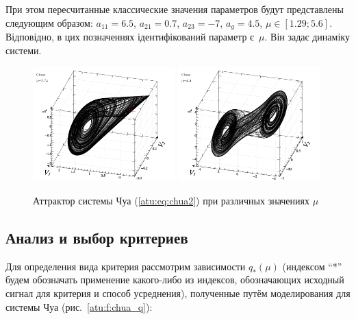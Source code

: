 При этом пересчитанные классические значения параметров будут представлены следующим образом:
$ a_{11} = 6.5 $, $a_{21} = 0.7$, $ a_{23} = -7 $, $ a_g = 4.5 $,
$ \mu \in [ 1.29 ; 5.6 ] $.
Відповідно, в цих позначеннях ідентифікований параметр є~$\mu$.
Він задає динаміку системи.



\begin{figure}[htb!]
\centerline{
  \includegraphics[width=0.49\textwidth]{p/cha/chua/chua_1-p_xyz_mu=2x74.png}
  \includegraphics[width=0.49\textwidth]{p/cha/chua/chua_1-p_xyz_mu=4x50.png}
}
\caption{Аттрактор системы Чуа (\ref{atu:eq:chua2}) при различных значениях $\mu$}
\label{atu:f:chua_phase}
\end{figure}



\subsection{Анализ и выбор критериев}  %


Для определения вида критерия рассмотрим зависимости
$q_{*}(\mu) $ (индексом ``*'' будем обозначать применение какого-либо из индексов,
обозначающих исходный сигнал для критерия и способ усреднения),
полученные путём моделирования
для системы Чуа (рис.~\ref{atu:f:chua_q}):

